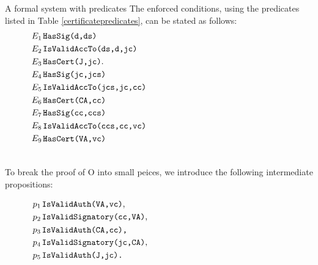 \begin{example}{A formal system with predicates}
The enforced conditions, using the predicates listed in Table 
\ref{certificatepredicates}, can be stated as follows:
\begin{eqnarray}\nonumber
\textup{$E_1$}:&&\hspace{-5mm}\parbox{10cm}{{\tt HasSig(d,ds)}}\\ \nonumber
\textup{$E_2$}:&&\hspace{-5mm}\parbox{10cm}{{\tt IsValidAccTo(ds,d,jc)}}\\\nonumber
\textup{$E_3$}:&&\hspace{-5mm}\parbox{10cm}{{\tt HasCert(J,jc)}.}\\\nonumber
\textup{$E_4$}:&&\hspace{-5mm}\parbox{10cm}{{\tt HasSig(jc,jcs)}}\\ \nonumber
\textup{$E_5$}:&&\hspace{-5mm}\parbox{10cm}{{\tt IsValidAccTo(jcs,jc,cc)}}\\ \nonumber
\textup{$E_6$}:&&\hspace{-5mm}\parbox{10cm}{{\tt HasCert(CA,cc)}}\\ \nonumber
\textup{$E_7$}:&&\hspace{-5mm}\parbox{10cm}{{\tt HasSig(cc,ccs)}}\\ \nonumber
\textup{$E_8$}:&&\hspace{-5mm}\parbox{10cm}{{\tt IsValidAccTo(ccs,cc,vc)}}\\ \nonumber
\textup{$E_9$}:&&\hspace{-5mm}\parbox{10cm}{{\tt HasCert(VA,vc)}}\\ \nonumber
\end{eqnarray}


To break the proof of O into small peices, we introduce the following
intermediate propositions:

\begin{eqnarray}\nonumber
\textup{$p_1$}:&&\hspace{-5mm}\parbox{10cm}{{\tt IsValidAuth(VA,vc)},}\\ \nonumber
\textup{$p_2$}:&&\hspace{-5mm}\parbox{10cm}{{\tt IsValidSignatory(cc,VA)},}\\ \nonumber
\textup{$p_3$}:&&\hspace{-5mm}\parbox{10cm}{\tt IsValidAuth(CA,cc),}\\\nonumber
\textup{$p_4$}:&&\hspace{-5mm}\parbox{10cm}{{\tt IsValidSignatory(jc,CA)},}\\ \nonumber
\textup{$p_5$}:&&\hspace{-5mm}\parbox{10cm}{\tt IsValidAuth(J,jc).}\\\nonumber
\end{eqnarray}



\end{example}
